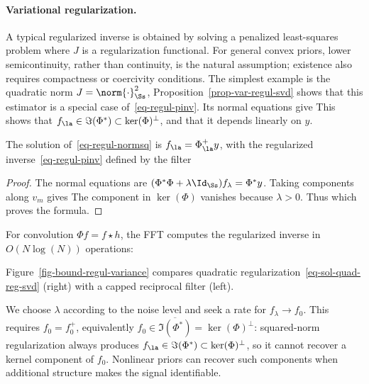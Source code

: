 \paragraph{Variational regularization.}

A typical regularized inverse is obtained by solving a penalized least-squares problem
where $J$ is a regularization functional. For general convex priors, lower semicontinuity, rather than continuity, is the natural assumption; existence also requires compactness or coercivity conditions. The simplest example is the quadratic norm $J=\norm{\cdot}_\Ss^2$,
Proposition~\ref{prop-var-regul-svd} shows that this estimator is a special case of~\eqref{eq-regul-pinv}. Its normal equations give
This shows that $f_\la \in \Im(\Phi^*)\subset\ker(\Phi)^\bot$, and that it depends linearly on $y$.

\begin{prop}\label{prop-var-regul-svd}
    The solution of~\eqref{eq-regul-normsq} is $f_\la = \Phi^+_\la y$, with the regularized inverse~\eqref{eq-regul-pinv} defined by the filter
\end{prop} 
\begin{proof}
The normal equations are $(\Phi^*\Phi+\lambda\Id_\Ss)f_\lambda=\Phi^*y$. Taking components along $v_m$ gives
The component in $\ker(\Phi)$ vanishes because $\lambda>0$. Thus
which proves the formula.

\end{proof}

For convolution $\Phi f = f \star h$, the FFT computes the regularized inverse in $O(N \log(N))$ operations:

Figure~\ref{fig-bound-regul-variance} compares quadratic regularization~\eqref{eq-sol-quad-reg-svd} (right) with a capped reciprocal filter (left).

We choose $\lambda$ according to the noise level and seek a rate for $f_\lambda\to f_0$. This requires $f_0=f_0^+$, equivalently $f_0\in\overline{\Im(\Phi^*)}=\ker(\Phi)^\bot$: squared-norm regularization always produces $f_\la\in\Im(\Phi^*)\subset\ker(\Phi)^\bot$, so it cannot recover a kernel component of $f_0$. Nonlinear priors can recover such components when additional structure makes the signal identifiable.

